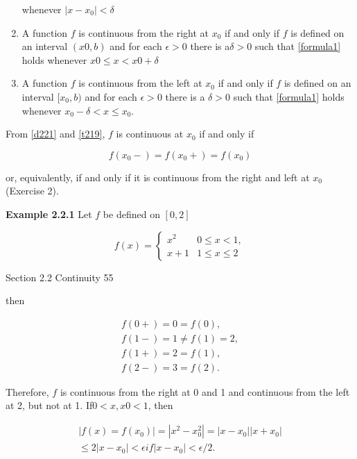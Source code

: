 \begin{flushleft}
\begin{theorem}
\begin{enumerate}[label=\alph*.]
whenever $\mid x - x_0 \mid < \delta$
\item  A function $f$ is continuous from the right at $x_0$ if and only if $f$ is defined on an
interval $(x0, b)$ and for each $ \epsilon  > 0$ there is a$\delta  > 0$ such that \ref{formula1} holds whenever
$x0 \leq x < x0 + \delta $
\item 
 A function $f$ is continuous from the left at $x_0$ if and only if $f$ is defined on an interval
$[x_0,b)$ and for each $\epsilon > 0$ 
there is a $\delta > 0$ such that \ref{formula1} holds whenever $x_0 - \delta <x \leq x_0 .$

\end{enumerate}
\end{theorem}

From \ref{d221} and \ref{t219}, $f$ is continuous at $x_0$ if and only if 

$$
f(x_0-) = f(x_0+)=f(x_0)
$$


or, equivalently, if and only if it is continuous from the right and left at $x_0$ (Exercise 2).


\textbf{Example 2.2.1} Let $f$ be defined on $[0,2] $

$$
f(x) =\begin{cases}x^2 & 0 \leq x < 1, \\ x+1 & 1 \leq  x \leq 2 \end{cases} 
$$

\newpage



Section 2.2 Continuity 55

 then


\begin{align*}
            f(0+) = 0 = f(0),\\
f(1-) = 1 \neq f(1) = 2 ,\\
f(1+) = 2 = f(1),\\
f(2-) = 3 = f(2). 
\end{align*}






Therefore, $f$ is continuous from the right at 0 and 1 and continuous from the left at 2, but
not at 1. If$ 0 < x, x0 < 1$, then


 \begin{align*}
|f(x) = f(x_0)| = |x^2 - x_0^2| = |x-x_0| |x+x_0| \\
\leq 2 |x-x_0| <  \epsilon   if  |x -x_0| < \epsilon /2.
  \end{align*}




\end{flushleft}
